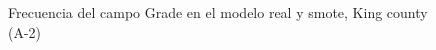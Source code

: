 \begin{figure}[H]
    \centering
    
    \caption{Frecuencia del campo Grade en el modelo real y smote, King county (A-2)}
    \label{frecuency-smote-grade}
\end{figure}